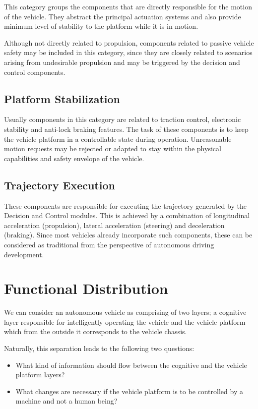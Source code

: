 This category groups the components that are directly responsible for the motion of the vehicle. They abstract the principal actuation systems and also
provide minimum level of stability to the platform while it is in motion. 

Although not directly related to propulsion, components related to passive vehicle safety may be included in this category, since they are closely related to scenarios arising from undesirable propulsion and may be triggered by the decision and control components.

\subsection{Platform Stabilization}

Usually components in this category are related to traction control, electronic stability and anti-lock braking features. The task of these components is to keep the vehicle platform in a controllable state during operation. Unreasonable motion requests may be rejected or adapted to stay within the physical capabilities and safety envelope of the vehicle.

\subsection{Trajectory Execution}

These components are responsible for executing the trajectory generated by the Decision and Control modules. This is achieved by a combination of longitudinal acceleration (propulsion), lateral acceleration  (steering) and deceleration (braking). Since most vehicles already incorporate such components, these can be considered as traditional from the perspective of autonomous driving development.


\section{Functional Distribution}

We can consider an autonomous vehicle as comprising of two layers; a cognitive 
layer responsible for intelligently operating the vehicle and the vehicle platform which from the outside it corresponds to the vehicle chassis. 

Naturally, this separation leads to the following two questions:

\begin{itemize}
\item What kind of information should flow between the cognitive and the vehicle platform layers?
\item What changes are necessary if the vehicle platform is to be controlled by a machine and not a human being?
\end{itemize}

